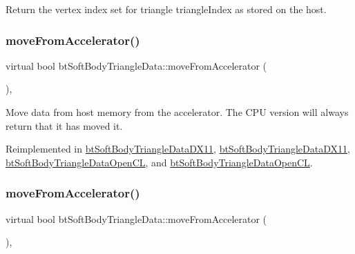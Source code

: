 Return the vertex index set for triangle triangle\+Index as stored on the host. \mbox{\label{classbtSoftBodyTriangleData_aa89f5f9a27c9350a95179535c4aaaf8c}} 
\subsubsection{\texorpdfstring{move\+From\+Accelerator()}{moveFromAccelerator()}\hspace{0.1cm}{\footnotesize\ttfamily [1/2]}}
{\footnotesize\ttfamily virtual bool bt\+Soft\+Body\+Triangle\+Data\+::move\+From\+Accelerator (\begin{DoxyParamCaption}{ }\end{DoxyParamCaption})\hspace{0.3cm}{\ttfamily [inline]}, {\ttfamily [virtual]}}

Move data from host memory from the accelerator. The C\+PU version will always return that it has moved it. 

Reimplemented in \hyperlink{classbtSoftBodyTriangleDataDX11_aeef8543b31e4ee314e7fdf971197276c}{bt\+Soft\+Body\+Triangle\+Data\+D\+X11}, \hyperlink{classbtSoftBodyTriangleDataDX11_a8b0e445184f7afe24741912aa5d93e72}{bt\+Soft\+Body\+Triangle\+Data\+D\+X11}, \hyperlink{classbtSoftBodyTriangleDataOpenCL_ab03606a0597e8990959452d975ec7bf2}{bt\+Soft\+Body\+Triangle\+Data\+Open\+CL}, and \hyperlink{classbtSoftBodyTriangleDataOpenCL_a6ff4ef4ea2e8491908c7bf742d4a8833}{bt\+Soft\+Body\+Triangle\+Data\+Open\+CL}.

\mbox{\label{classbtSoftBodyTriangleData_aa89f5f9a27c9350a95179535c4aaaf8c}} 
\subsubsection{\texorpdfstring{move\+From\+Accelerator()}{moveFromAccelerator()}\hspace{0.1cm}{\footnotesize\ttfamily [2/2]}}
{\footnotesize\ttfamily virtual bool bt\+Soft\+Body\+Triangle\+Data\+::move\+From\+Accelerator (\begin{DoxyParamCaption}{ }\end{DoxyParamCaption})\hspace{0.3cm}{\ttfamily [inline]}, {\ttfamily [virtual]}}

